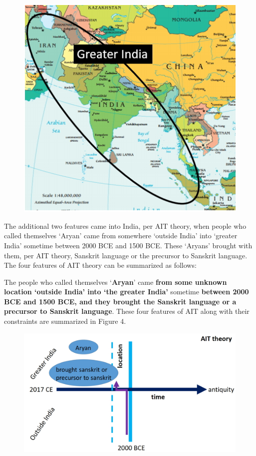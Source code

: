 \begin{figure}[!htbp]
\includegraphics[scale=0.38]{"images/8-03.jpg"}
\caption{}\label{art8-fig03}
\end{figure}

The additional two features came into India, per AIT theory, when people who called themselves ‘Aryan’ came from somewhere ‘outside India’ into ‘greater India’ sometime between 2000 BCE and 1500 BCE. These ‘Aryans’ brought with them, per AIT theory, Sanskrit language or the precursor to Sanskrit language. The four features of AIT theory can be summarized as follows:

The people who called themselves ‘\textbf{Aryan}’ came \textbf{from some unknown location ‘outside India’ into ‘the greater India’} sometime \textbf{between 2000 BCE and 1500 BCE, and they brought the Sanskrit language or a precursor to Sanskrit language}. These four features of AIT along with their constraints are summarized in Figure 4.

\begin{figure}[!htbp]
\includegraphics[scale=0.21]{"images/8-04.jpg"}
\caption{}\label{art8-fig04}
\end{figure}


